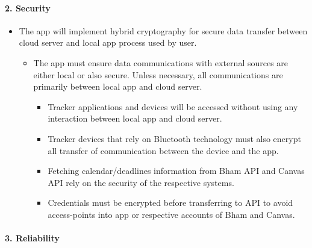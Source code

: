 \documentclass[a4paper,11pt]{article} %
\begin{document}
\hypertarget{security}{%
\paragraph{2. Security}\label{security}}

\begin{itemize}
\item
  The app will implement hybrid cryptography for secure data transfer
  between cloud server and local app process used by user.

  \begin{itemize}
  \item
    The app must ensure data communications with external sources are
    either local or also secure. Unless necessary, all communications
    are primarily between local app and cloud server.

    \begin{itemize}
    \item
      Tracker applications and devices will be accessed without using
      any interaction between local app and cloud server.
    \item
      Tracker devices that rely on Bluetooth technology must also
      encrypt all transfer of communication between the device and the
      app.
    \item
      Fetching calendar/deadlines information from Bham API and Canvas
      API rely on the security of the respective systems.
    \item
      Credentials must be encrypted before transferring to API to avoid
      access-points into app or respective accounts of Bham and Canvas.
    \end{itemize}
  \end{itemize}
\end{itemize}

\hypertarget{reliability}{%
\paragraph{3. Reliability}\label{reliability}}
\end{document}
